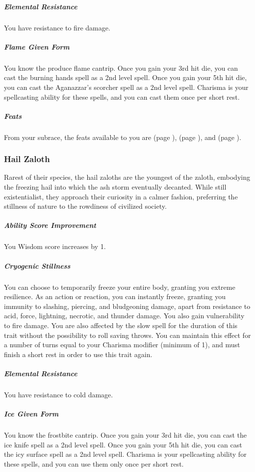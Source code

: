    \subparagraph{Elemental Resistance} You have resistance to fire damage.

    \subparagraph{Flame Given Form} You know the produce flame cantrip.
    Once you gain your 3rd hit die, you can cast the burning hands spell as a 2nd level spell.
    Once you gain your 5th hit die, you can cast the Aganazzar's scorcher spell as a 2nd level spell.
    Charisma is your spellcasting ability for these spells, and you can cast them once per short rest.

    \subparagraph{Feats} From your subrace, the feats available to you are
    \textbf{} (page \pageref{feat::}),
    \textbf{} (page \pageref{feat::}), and
    \textbf{} (page \pageref{feat::}).

\subsubsection{Hail Zaloth}
    Rarest of their species, the hail zaloths are the youngest of the zaloth, embodying the freezing hail into which the ash storm eventually decanted.
    While still existentialist, they approach their curiosity in a calmer fashion, preferring the stillness of nature to the rowdiness of civilized society.

    \subparagraph{Ability Score Improvement} You Wisdom score increases by 1.

    \subparagraph{Cryogenic Stillness} You can choose to temporarily freeze your entire body, granting you extreme resilience.
    As an action or reaction, you can instantly freeze, granting you immunity to slashing, piercing, and bludgeoning damage, apart from resistance to acid, force, lightning, necrotic, and thunder damage.
    You also gain vulnerability to fire damage.
    You are also affected by the slow spell for the duration of this trait without the possibility to roll saving throws.
    You can maintain this effect for a number of turns equal to your Charisma modifier (minimum of 1), and must finish a short rest in order to use this trait again.

    \subparagraph{Elemental Resistance} You have resistance to cold damage.

    \subparagraph{Ice Given Form} You know the frostbite cantrip.
    Once you gain your 3rd hit die, you can cast the ice knife spell as a 2nd level spell.
    Once you gain your 5th hit die, you can cast the icy surface spell as a 2nd level spell.
    Charisma is your spellcasting ability for these spells, and you can use them only once per short rest.

